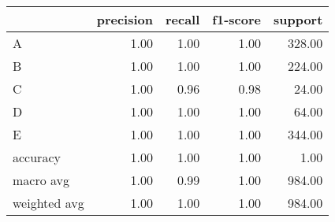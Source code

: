 \begin{tabular}{|l|r|r|r|r|}
\hline
{} &  precision &  recall &  f1-score &  support \\
\hline
A            &       1.00 &    1.00 &      1.00 &   328.00 \\
B            &       1.00 &    1.00 &      1.00 &   224.00 \\
C            &       1.00 &    0.96 &      0.98 &    24.00 \\
D            &       1.00 &    1.00 &      1.00 &    64.00 \\
E            &       1.00 &    1.00 &      1.00 &   344.00 \\
accuracy     &       1.00 &    1.00 &      1.00 &     1.00 \\
macro avg    &       1.00 &    0.99 &      1.00 &   984.00 \\
weighted avg &       1.00 &    1.00 &      1.00 &   984.00 \\
\hline
\end{tabular}
